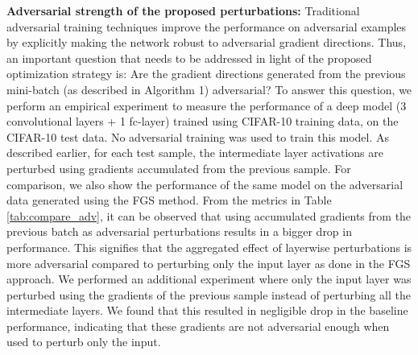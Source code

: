 \documentclass[letterpaper]{article} %
\begin{document}
\begin{table}
\centering
{}
\label{tab:compare_adv}
\end{table}
\textbf{Adversarial strength of the proposed perturbations:} Traditional adversarial training techniques improve the performance on adversarial examples by explicitly making the network robust to adversarial gradient directions. Thus, an important question that needs to be addressed in light of the proposed optimization strategy is: Are the gradient directions generated from the previous mini-batch (as described in Algorithm 1) adversarial? To answer this question, we perform an empirical experiment to measure the performance of a deep model (3 convolutional layers + 1 fc-layer) trained using CIFAR-10 training data, on the CIFAR-10 test data. No adversarial training was used to train this model. As described earlier, for each test sample, the intermediate layer activations are perturbed using gradients accumulated from the previous sample. For comparison, we also show the performance of the same model on the adversarial data generated using the FGS method. From the metrics in Table \ref{tab:compare_adv}, it can be observed that using accumulated gradients from the previous batch as adversarial perturbations results in a bigger drop in performance. This signifies that the aggregated effect of layerwise perturbations is more adversarial compared to perturbing only the input layer as done in the FGS approach. We performed an additional experiment where only the input layer was perturbed using the gradients of the previous sample instead of perturbing all the intermediate layers. We found that this resulted in negligible drop in the baseline performance, indicating that these gradients are not adversarial enough when used to perturb only the input. 
\end{document}
